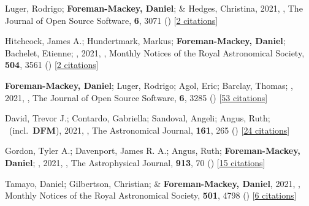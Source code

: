 \item[{\color{numcolor}\scriptsize68}] Luger, Rodrigo; \textbf{Foreman-Mackey, Daniel}; \& Hedges, Christina, 2021, , The Journal of Open Source Software, \textbf{6}, 3071 () [\href{https://ui.adsabs.harvard.edu/abs/2021JOSS....6.3071L}{2 citations}]

\item[{\color{numcolor}\scriptsize67}] Hitchcock, James A.; Hundertmark, Markus; \textbf{Foreman-Mackey, Daniel}; Bachelet, Etienne; \etal, 2021, , Monthly Notices of the Royal Astronomical Society, \textbf{504}, 3561 () [\href{https://ui.adsabs.harvard.edu/abs/2021MNRAS.504.3561H}{2 citations}]

\item[{\color{numcolor}\scriptsize66}] \textbf{Foreman-Mackey, Daniel}; Luger, Rodrigo; Agol, Eric; Barclay, Thomas; \etal, 2021, , The Journal of Open Source Software, \textbf{6}, 3285 () [\href{https://ui.adsabs.harvard.edu/abs/2021JOSS....6.3285F}{53 citations}]

\item[{\color{numcolor}\scriptsize65}] David, Trevor J.; Contardo, Gabriella; Sandoval, Angeli; Angus, Ruth; \etal\ (incl.\ \textbf{DFM}), 2021, , The Astronomical Journal, \textbf{161}, 265 () [\href{https://ui.adsabs.harvard.edu/abs/2021AJ....161..265D}{24 citations}]

\item[{\color{numcolor}\scriptsize64}] Gordon, Tyler A.; Davenport, James R. A.; Angus, Ruth; \textbf{Foreman-Mackey, Daniel}; \etal, 2021, , The Astrophysical Journal, \textbf{913}, 70 () [\href{https://ui.adsabs.harvard.edu/abs/2021ApJ...913...70G}{15 citations}]

\item[{\color{numcolor}\scriptsize63}] Tamayo, Daniel; Gilbertson, Christian; \& \textbf{Foreman-Mackey, Daniel}, 2021, , Monthly Notices of the Royal Astronomical Society, \textbf{501}, 4798 () [\href{https://ui.adsabs.harvard.edu/abs/2021MNRAS.501.4798T}{6 citations}]

